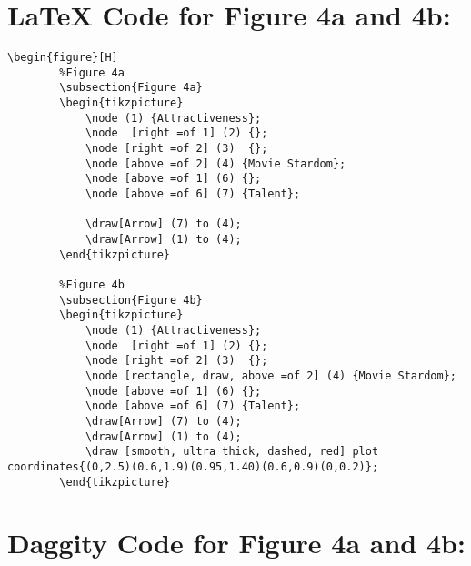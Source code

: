 \documentclass{article}
\begin{document}
\section*{\LaTeX\hspace*{1mm} Code for Figure 4a and 4b:}
\begin{lstlisting}[frame=single, basicstyle=\ttfamily]
    \begin{figure}[H]
        %Figure 4a
        \subsection{Figure 4a}
        \begin{tikzpicture}
            \node (1) {Attractiveness};
            \node  [right =of 1] (2) {};
            \node [right =of 2] (3)  {};
            \node [above =of 2] (4) {Movie Stardom};
            \node [above =of 1] (6) {};
            \node [above =of 6] (7) {Talent};
        
            \draw[Arrow] (7) to (4);
            \draw[Arrow] (1) to (4);
        \end{tikzpicture}

        %Figure 4b
        \subsection{Figure 4b}
        \begin{tikzpicture}
            \node (1) {Attractiveness};
            \node  [right =of 1] (2) {};
            \node [right =of 2] (3)  {};
            \node [rectangle, draw, above =of 2] (4) {Movie Stardom};
            \node [above =of 1] (6) {};
            \node [above =of 6] (7) {Talent};
            \draw[Arrow] (7) to (4);
            \draw[Arrow] (1) to (4);
            \draw [smooth, ultra thick, dashed, red] plot coordinates{(0,2.5)(0.6,1.9)(0.95,1.40)(0.6,0.9)(0,0.2)};
        \end{tikzpicture}
\end{lstlisting}



\section*{Daggity Code for Figure 4a and 4b:}
\begin{lstlisting}[frame=single, basicstyle=\ttfamily]

\end{lstlisting}
\end{document}
